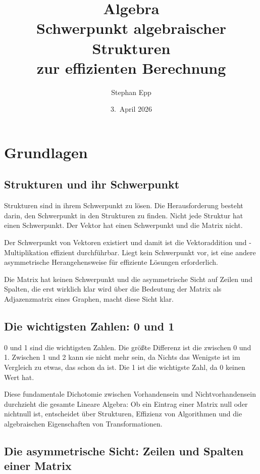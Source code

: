 \documentclass[a4paper,12pt]{report}
\title{\textbf{Algebra} \\ {\large \textbf{Schwerpunkt algebraischer Strukturen \\ [-0.3em] zur effizienten Berechnung}}}
\author{Stephan Epp}
\date{3.\ April 2026}
\theoremstyle{definition}
\begin{document}
	\hypersetup{pageanchor=false}
	\maketitle
	\tableofcontents
	\hypersetup{pageanchor=true}
	\newpage

	\chapter{Grundlagen}

	\section{Strukturen und ihr Schwerpunkt}

	Strukturen sind in ihrem Schwerpunkt zu lösen. Die Herausforderung besteht darin, den Schwerpunkt in den Strukturen zu finden. Nicht jede Struktur hat einen Schwerpunkt. Der Vektor hat einen Schwerpunkt und die Matrix nicht.

	Der Schwerpunkt von Vektoren existiert und damit ist die Vektoraddition und -Multiplikation effizient durchführbar. Liegt kein Schwerpunkt vor, ist eine andere asymmetrische Herangehensweise für effiziente Lösungen erforderlich.

	Die Matrix hat keinen Schwerpunkt und die asymmetrische Sicht auf Zeilen und Spalten, die erst wirklich klar wird über die Bedeutung der Matrix als Adjazenzmatrix eines Graphen, macht diese Sicht klar.

	\section{Die wichtigsten Zahlen: 0 und 1}

	0 und 1 sind die wichtigsten Zahlen. Die größte Differenz ist die zwischen 0 und 1. Zwischen 1 und 2 kann sie nicht mehr sein, da Nichts das Wenigste ist im Vergleich zu etwas, das schon da ist. Die 1 ist die wichtigste Zahl, da 0 keinen Wert hat.

	Diese fundamentale Dichotomie zwischen Vorhandensein und Nichtvorhandensein durchzieht die gesamte Lineare Algebra: Ob ein Eintrag einer Matrix null oder nichtnull ist, entscheidet über Strukturen, Effizienz von Algorithmen und die algebraischen Eigenschaften von Transformationen.

	\section{Die asymmetrische Sicht: Zeilen und Spalten einer Matrix}
\end{document}
